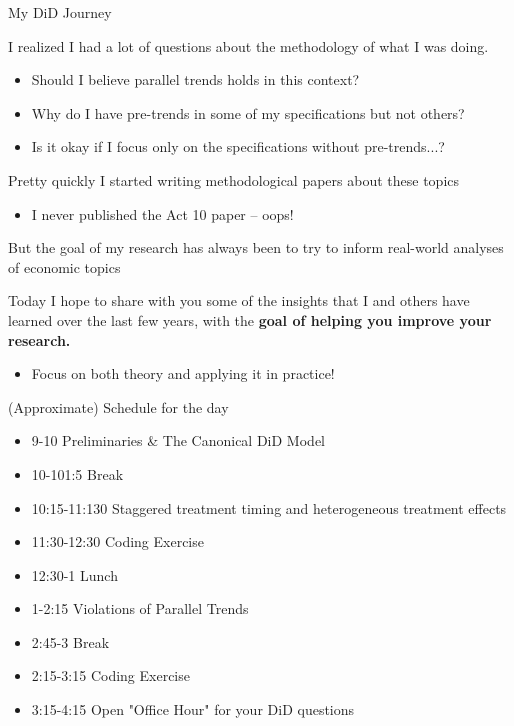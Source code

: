 \documentclass[aspectratio = 169, 12pt]{beamer}
\begin{document}
\begin{frame}{My DiD Journey}
  \begin{wideitemize}
    \item
    I realized I had a lot of questions about the methodology of what I was doing.
    \begin{itemize}
      \item
            Should I believe parallel trends holds in this context?

      \item
            Why do I have pre-trends in some of my specifications but not others?

      \item
            Is it okay if I focus only on the specifications without pre-trends...?
    \end{itemize}

    \pause
    \item Pretty quickly I started writing methodological papers about these topics
    \begin{itemize}
      \item
            I never published the Act 10 paper -- oops!
    \end{itemize}

    \item But the goal of my research has always been to try to inform real-world analyses of economic topics

    \pause
    \item Today I hope to share with you some of the insights that I and others have learned over the last few years, with the \textbf{goal of helping you improve your research.}
    \begin{itemize}
      \item
            Focus on both theory and applying it in practice!
    \end{itemize}

  \end{wideitemize}
\end{frame}


\begin{frame}{(Approximate) Schedule for the day}
\begin{itemize}
	\item 9-10 Preliminaries \& The Canonical DiD Model
	\item 10-101:5 Break
	\item 10:15-11:130 Staggered treatment timing and heterogeneous treatment effects
	\item 11:30-12:30 Coding Exercise
	\item 12:30-1 Lunch
	\item 1-2:15 Violations of Parallel Trends
	\item 2:45-3 Break
	\item 2:15-3:15 Coding Exercise
	\item 3:15-4:15 Open "Office Hour" for your DiD questions
\end{itemize}
\end{frame}
\end{document}
